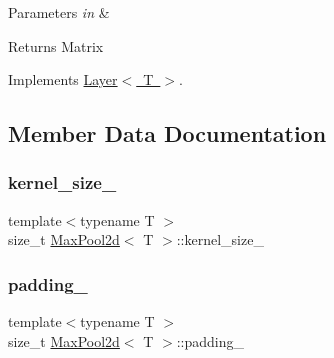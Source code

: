 \begin{DoxyParams}{Parameters}
{\em in} & \\
\hline
\end{DoxyParams}
\begin{DoxyReturn}{Returns}
Matrix 
\end{DoxyReturn}


Implements \mbox{\hyperlink{class_layer_ab15b665c86974b1cf1d7ba4e309cb0e5}{Layer$<$ T $>$}}.



\subsection{Member Data Documentation}
\mbox{\label{class_max_pool2d_a665aa0f6561a8a7883d2746efeb68f88}} 
\subsubsection{\texorpdfstring{kernel\_size\_}{kernel\_size\_}}
{\footnotesize\ttfamily template$<$typename T $>$ \\
size\+\_\+t \mbox{\hyperlink{class_max_pool2d}{Max\+Pool2d}}$<$ T $>$\+::kernel\+\_\+size\+\_\+\hspace{0.3cm}{\ttfamily [protected]}}

\mbox{\label{class_max_pool2d_ab1dd4757718ee42e14bb7fdcf2a2be2c}} 
\subsubsection{\texorpdfstring{padding\_}{padding\_}}
{\footnotesize\ttfamily template$<$typename T $>$ \\
size\+\_\+t \mbox{\hyperlink{class_max_pool2d}{Max\+Pool2d}}$<$ T $>$\+::padding\+\_\+\hspace{0.3cm}{\ttfamily [protected]}}

\mbox{\label{class_max_pool2d_af8701b485ce94e4e3242a22e25350c80}} 
